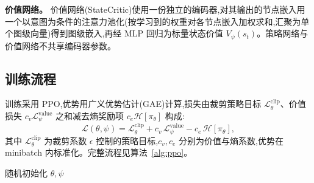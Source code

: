 \textbf{价值网络。} 价值网络(StateCritic)使用一份独立的编码器,对其输出的节点嵌入用一个以意图为条件的注意力池化(按学习到的权重对各节点嵌入加权求和,汇聚为单个图级向量)得到图级嵌入,再经 MLP 回归为标量状态价值 $V_\psi(s_t)$。策略网络与价值网络不共享编码器参数。

\subsection{训练流程}
\label{sec:method:train}

训练采用 PPO,优势用广义优势估计(GAE)计算,损失由裁剪策略目标 $\mathcal{L}^{\text{clip}}_\theta$、价值损失 $c_v\mathcal{L}^{\text{value}}_\psi$ 之和减去熵奖励项 $c_e\mathcal{H}[\pi_\theta]$ 构成:
\begin{equation}
\mathcal{L}(\theta,\psi) = \mathcal{L}^{\text{clip}}_\theta + c_v\,\mathcal{L}^{\text{value}}_\psi - c_e\,\mathcal{H}[\pi_\theta],
\label{eq:loss}
\end{equation}
其中 $\mathcal{L}^{\text{clip}}_\theta$ 为裁剪系数 $\epsilon$ 控制的策略目标,$c_v,c_e$ 分别为价值与熵系数,优势在 minibatch 内标准化。完整流程见算法~\ref{alg:ppo}。

\begin{algorithm}[t]
\caption{流感知 FiLM-GNN 的 PPO 训练}
\label{alg:ppo}
随机初始化 $\theta,\psi$\;
\end{algorithm}
